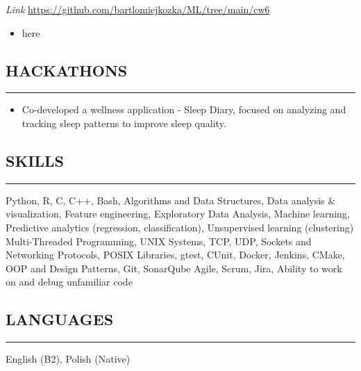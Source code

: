 \documentclass{article}
\begin{document}
\noindent
{}
\textit{Link}
\href{https://github.com/bartlomiejkozka/ML/tree/main/cw6}{https://github.com/bartlomiejkozka/ML/tree/main/cw6}
\begin{itemize}[itemsep=-3pt, topsep=3pt]
    \item here
\end{itemize}


\subsection*{HACKATHONS}
\vspace{-1.5em}
\rule{\textwidth}{0.1pt}
\vspace{-0.5em}

\noindent
{}
\begin{itemize}[itemsep=-3pt, topsep=3pt]
    \item Co-developed a wellness application - Sleep Diary, focused on analyzing and tracking sleep patterns to improve sleep quality.
\end{itemize}


\subsection*{SKILLS}
\vspace{-1.5em}
\rule{\textwidth}{0.1pt}
Python, R, C, C++, Bash, Algorithms and Data Structures, 
Data analysis \& visualization, Feature engineering, Exploratory Data Analysis,
Machine learning, Predictive analytics (regression, classification), Unsupervised learning (clustering)
Multi-Threaded Programming, UNIX Systems, TCP, UDP, Sockets and Networking Protocols, POSIX Libraries, 
gtest, CUnit, Docker, Jenkins, CMake, OOP and Design Patterns, Git, SonarQube  
Agile, Scrum, Jira, Ability to work on and debug unfamiliar code


\subsection*{LANGUAGES}
\vspace{-1.5em}
\rule{\textwidth}{0.1pt}
English (B2), Polish (Native)
\end{document}
